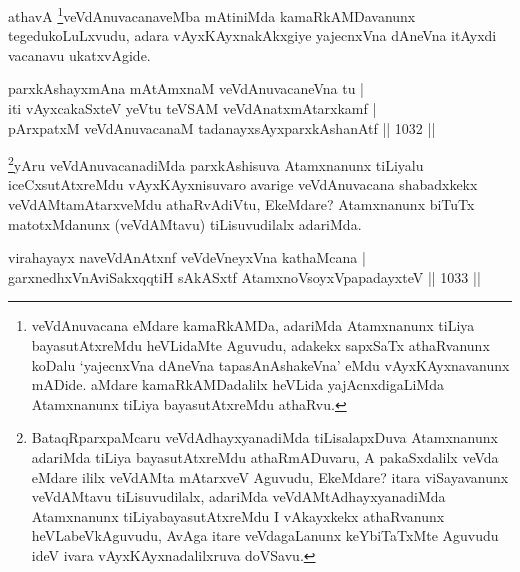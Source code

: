 \begin{artha}
athavA \footnote{veVdAnuvacana eMdare kamaRkAMDa, adariMda Atamxnanunx tiLiya bayasutAtxreMdu heVLidaMte Aguvudu, adakekx sapxSaTx athaRvanunx koDalu `yajecnxVna dAneVna tapasA\s nAshakeVna' eMdu vAyxKAyxnavanunx mADide. aMdare kamaRkAMDadalilx heVLida yajAcnxdigaLiMda Atamxnanunx tiLiya bayasutAtxreMdu athaRvu.}veVdAnuvacanaveMba mAtiniMda kamaRkAMDavanunx tegedukoLuLxvudu, adara vAyxKAyxnakAkxgiye yajecnxVna dAneVna itAyxdi vacanavu ukatxvAgide.
\end{artha}


\begin{shl}
parxkAshayxmAna mAtAmxnaM veVdAnuvacaneVna tu |\\
iti vAyxcakaSxteV yeVtu teVSAM veVdAnatxmAtarxkamf |\\
pArxpatxM veVdAnuvacanaM tadanayxsAyxparxkAshanAtf \hfill || 1032 ||
\end{shl}

\begin{artha}
\footnote{BataqRparxpaMcaru veVdAdhayxyanadiMda tiLisalapxDuva Atamxnanunx adariMda tiLiya bayasutAtxreMdu athaRmADuvaru, A pakaSxdalilx veVda eMdare ililx veVdAMta mAtarxveV Aguvudu, EkeMdare? itara viSayavanunx veVdAMtavu tiLisuvudilalx, adariMda veVdAMtAdhayxyanadiMda Atamxnanunx tiLiyabayasutAtxreMdu I vAkayxkekx athaRvanunx heVLabeVkAguvudu, AvAga itare veVdagaLanunx keYbiTaTxMte Aguvudu ideV ivara vAyxKAyxnadalilxruva doVSavu.}yAru veVdAnuvacanadiMda parxkAshisuva Atamxnanunx tiLiyalu iceCxsutAtxreMdu vAyxKAyxnisuvaro avarige veVdAnuvacana shabadxkekx veVdAMtamAtarxveMdu athaRvAdiVtu, EkeMdare? Atamxnanunx biTuTx matotxMdanunx (veVdAMtavu) tiLisuvudilalx adariMda.
\end{artha}





\begin{shl}
virahayayx naveVdAnAtxnf veVdeVneyxVna kathaMcana |
garxnedhxVnA\s\s viSakxqqtiH sAkASxtf AtamxnoVsoyxVpapadayxteV || 1033 ||
\end{shl}


